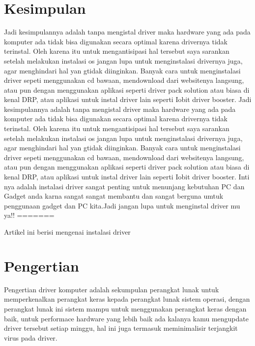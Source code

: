 \section{Kesimpulan}
Jadi kesimpulannya adalah tanpa mengistal driver maka hardware yang ada pada komputer ada tidak bisa digunakan secara optimal karena drivernya tidak terinstal. Oleh karena itu untuk mengantisipasi hal tersebut saya sarankan setelah melakukan instalasi os jangan lupa untuk menginstalasi drivernya juga, agar menghindari hal yan gtidak diinginkan. Banyak cara untuk menginstalasi driver sepeti menggunakan cd bawaan, mendownload dari websitenya langsung, atau pun dengan menggunakan aplikasi seperti driver pack solution atau biasa di kenal DRP, atau aplikasi untuk instal driver lain seperti Iobit driver booster.
Jadi kesimpulannya adalah tanpa mengistal driver maka hardware yang ada pada komputer ada tidak bisa digunakan secara optimal karena drivernya tidak terinstal. Oleh karena itu untuk mengantisipasi hal tersebut saya sarankan setelah melakukan instalasi os jangan lupa untuk menginstalasi drivernya juga, agar menghindari hal yan gtidak diinginkan. Banyak cara untuk menginstalasi driver sepeti menggunakan cd bawaan, mendownload dari websitenya langsung, atau pun dengan menggunakan aplikasi seperti driver pack solution atau biasa di kenal DRP, atau aplikasi untuk instal driver lain seperti Iobit driver booster. Inti nya adalah instalasi driver sangat penting untuk menunjang kebutuhan PC dan Gadget anda karna sangat sangat membantu dan sangat berguna umtuk penggunaan gadget dan PC kita.Jadi jangan lupa untuk menginstal driver mu ya!!
=======
﻿%


%

Artikel ini berisi mengenai instalasi driver
\section{Pengertian}
Pengertian driver komputer adalah sekumpulan perangkat lunak untuk memperkenalkan perangkat keras kepada perangkat lunak sistem operasi, dengan perangkat lunak ini sistem mampu untuk menggunakan perangkat keras dengan baik, untuk performace hardware yang lebih baik ada kalanya kamu mengupdate driver tersebut setiap minggu, hal ini juga termasuk meminimalisir terjangkit virus pada driver.

